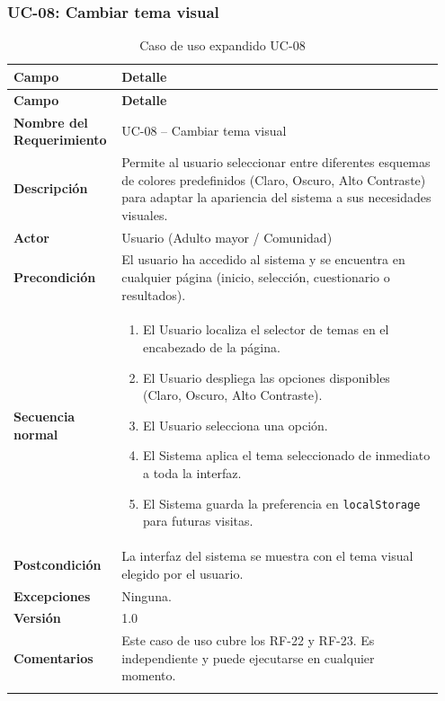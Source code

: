 \subsubsection{UC-08: Cambiar tema visual}

\begin{longtable}{p{0.22\linewidth} p{0.73\linewidth}}
\toprule
\rowcolor{tableheader!20}
\textbf{Campo} & \textbf{Detalle} \\
\midrule
\endfirsthead
\rowcolor{tableheader!20}
\textbf{Campo} & \textbf{Detalle} \\
\midrule
\endhead
\bottomrule
\endfoot
\textbf{Nombre del Requerimiento} & UC-08 -- Cambiar tema visual \\
\textbf{Descripción} & Permite al usuario seleccionar entre diferentes esquemas de colores predefinidos (Claro, Oscuro, Alto Contraste) para adaptar la apariencia del sistema a sus necesidades visuales. \\
\textbf{Actor} & Usuario (Adulto mayor / Comunidad) \\
\textbf{Precondición} & El usuario ha accedido al sistema y se encuentra en cualquier página (inicio, selección, cuestionario o resultados). \\
\textbf{Secuencia normal} & 
  \begin{enumerate}
    \item El Usuario localiza el selector de temas en el encabezado de la página.
    \item El Usuario despliega las opciones disponibles (Claro, Oscuro, Alto Contraste).
    \item El Usuario selecciona una opción.
    \item El Sistema aplica el tema seleccionado de inmediato a toda la interfaz.
    \item El Sistema guarda la preferencia en \texttt{localStorage} para futuras visitas.
  \end{enumerate} \\
\textbf{Postcondición} & La interfaz del sistema se muestra con el tema visual elegido por el usuario. \\
\textbf{Excepciones} & Ninguna. \\
\textbf{Versión} & 1.0 \\
\textbf{Comentarios} & Este caso de uso cubre los RF-22 y RF-23. Es independiente y puede ejecutarse en cualquier momento. \\
\bottomrule
\caption{Caso de uso expandido UC-08}
\label{tab:uc08}
\end{longtable}


